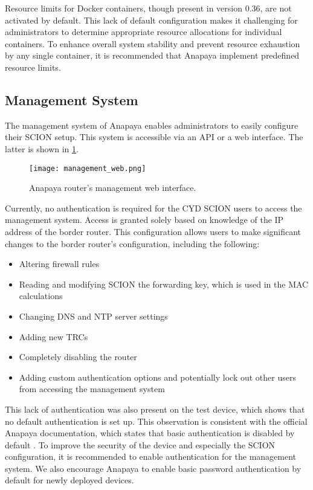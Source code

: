 Resource limits for Docker containers, though present in version 0.36, are not activated by default.
This lack of default configuration makes it challenging for administrators to determine appropriate resource allocations for individual containers.
To enhance overall system stability and prevent resource exhaustion by any single container, it is recommended that Anapaya implement predefined resource limits.


\subsection{Management System}
\label{sec:management-system}
The management system of Anapaya enables administrators to easily configure their SCION setup.
This system is accessible via an API or a web interface.
The latter is shown in \cref{fig:anapaya_web_interface}.

\begin{figure}
    \centering
    \texttt{[image: management\_web.png]}
    \caption{Anapaya router's management web interface.}
    \label{fig:anapaya_web_interface}
\end{figure}

Currently, no authentication is required for the CYD SCION users to access the management system.
Access is granted solely based on knowledge of the IP address of the border router.
This configuration allows users to make significant changes to the border router's configuration, including the following:

\begin{itemize}
    \item Altering firewall rules
    \item Reading and modifying SCION the forwarding key, which is used in the MAC calculations
    \item Changing DNS and NTP server settings
    \item Adding new TRCs
    \item Completely disabling the router
    \item Adding custom authentication options and potentially lock out other users from accessing the management system
\end{itemize}

This lack of authentication was also present on the test device, which shows that no default authentication is set up.
This observation is consistent with the official Anapaya documentation, which states that basic authentication is disabled by default \cite{anapayaManagemenDoc}.
To improve the security of the device and especially the SCION configuration, it is recommended to enable authentication for the management system.
We also encourage Anapaya to enable basic password authentication by default for newly deployed devices.

